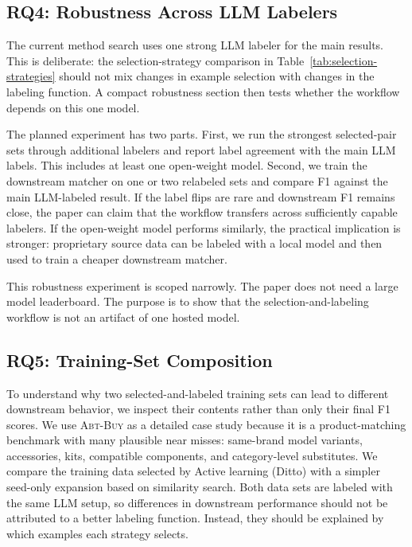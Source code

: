 \subsection{RQ4: Robustness Across LLM Labelers}

The current method search uses one strong LLM labeler for the main results. This is deliberate: the selection-strategy comparison in Table~\ref{tab:selection-strategies} should not mix changes in example selection with changes in the labeling function. A compact robustness section then tests whether the workflow depends on this one model.

The planned experiment has two parts. First, we run the strongest selected-pair sets through additional labelers and report label agreement with the main LLM labels. This includes at least one open-weight model. Second, we train the downstream matcher on one or two relabeled sets and compare F1 against the main LLM-labeled result. If the label flips are rare and downstream F1 remains close, the paper can claim that the workflow transfers across sufficiently capable labelers. If the open-weight model performs similarly, the practical implication is stronger: proprietary source data can be labeled with a local model and then used to train a cheaper downstream matcher.

This robustness experiment is scoped narrowly. The paper does not need a large model leaderboard. The purpose is to show that the selection-and-labeling workflow is not an artifact of one hosted model.

\subsection{RQ5: Training-Set Composition}

To understand why two selected-and-labeled training sets can lead to different downstream behavior, we inspect their contents rather than only their final F1 scores. We use \textsc{Abt-Buy} as a detailed case study because it is a product-matching benchmark with many plausible near misses: same-brand model variants, accessories, kits, compatible components, and category-level substitutes. We compare the training data selected by Active learning (Ditto) with a simpler seed-only expansion based on similarity search. Both data sets are labeled with the same LLM setup, so differences in downstream performance should not be attributed to a better labeling function. Instead, they should be explained by which examples each strategy selects.

